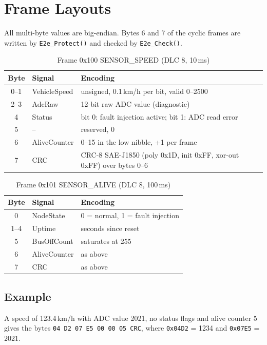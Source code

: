 \chapter{Frame Layouts}
\label{app:frames}

All multi-byte values are big-endian. Bytes 6 and 7 of the cyclic frames are written by \texttt{E2e\_Protect()} and checked by \texttt{E2e\_Check()}.

\begin{table}[H]
\centering
\small
\caption{Frame 0x100 SENSOR\_SPEED (DLC 8, 10\,ms)}
\label{tab:frame100}
\begin{tabularx}{\textwidth}{@{}clX@{}}
\toprule
\textbf{Byte} & \textbf{Signal} & \textbf{Encoding} \\
\midrule
0--1 & VehicleSpeed & unsigned, 0.1\,km/h per bit, valid 0--2500 \\
2--3 & AdcRaw & 12-bit raw ADC value (diagnostic) \\
4 & Status & bit 0: fault injection active; bit 1: ADC read error \\
5 & -- & reserved, 0 \\
6 & AliveCounter & 0--15 in the low nibble, +1 per frame \\
7 & CRC & CRC-8 SAE-J1850 (poly 0x1D, init 0xFF, xor-out 0xFF) over bytes 0--6 \\
\bottomrule
\end{tabularx}
\end{table}

\begin{table}[H]
\centering
\small
\caption{Frame 0x101 SENSOR\_ALIVE (DLC 8, 100\,ms)}
\label{tab:frame101}
\begin{tabularx}{\textwidth}{@{}clX@{}}
\toprule
\textbf{Byte} & \textbf{Signal} & \textbf{Encoding} \\
\midrule
0 & NodeState & 0 = normal, 1 = fault injection \\
1--4 & Uptime & seconds since reset \\
5 & BusOffCount & saturates at 255 \\
6 & AliveCounter & as above \\
7 & CRC & as above \\
\bottomrule
\end{tabularx}
\end{table}

\section*{Example}
A speed of 123.4\,km/h with ADC value 2021, no status flags and alive counter 5 gives the bytes \texttt{04 D2 07 E5 00 00 05 CRC}, where \texttt{0x04D2} = 1234 and \texttt{0x07E5} = 2021.
